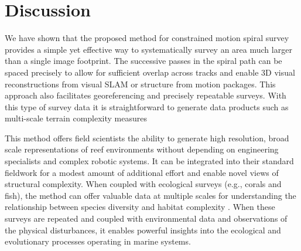 \section{Discussion}
We have shown that the proposed method for constrained motion spiral survey provides a simple yet effective way to systematically survey an area much larger than a single image footprint. The successive passes in the spiral path can be spaced precisely to allow for sufficient overlap across tracks and enable 3D visual reconstructions from visual SLAM or structure from motion packages. This approach also facilitates georeferencing and precisely repeatable surveys. With this type of survey data it is straightforward to generate data products such as multi-scale terrain complexity measures \cite{Friedman_2012}

This method offers field scientists the ability to generate high resolution, broad scale representations of reef environments without depending on engineering specialists and complex robotic systems. It can be integrated into their standard fieldwork for a modest amount of additional effort and enable novel views of structural complexity. When coupled with ecological surveys (e.g., corals and fish), the method can offer valuable data at multiple scales for understanding the relationship between species diversity and habitat complexity  \cite{Graham_2012}. When these surveys are repeated and coupled with environmental data and observations of the physical disturbances, it enables powerful insights into the ecological and evolutionary processes operating in marine systems.

